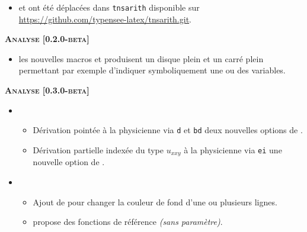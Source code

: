 \documentclass[12pt,a4paper]{book}
\begin{document}
\begin{description}
    \begin{itemize}[itemsep=.5em]
        \item {}  et  ont été déplacées dans \texttt{tnsarith} disponible sur \url{https://github.com/typensee-latex/tnsarith.git}.
    \end{itemize}
    
    
    \begin{center}
        \textbf{\textsc{Analyse [0.2.0-beta]}}
    \end{center}
    
    \begin{itemize}[itemsep=.5em]
        \item {} les nouvelles macros  et  produisent un disque plein et un carré plein permettant par exemple d'indiquer symboliquement une ou des variables.
        
        
    \end{itemize}
    
    
    \begin{center}
        \textbf{\textsc{Analyse [0.3.0-beta]}}
    \end{center}
    
    \begin{itemize}[itemsep=.5em]
        \item {}
        \begin{itemize}[itemsep=.5em]
            \item Dérivation pointée à la physicienne via \verb+d+ et \verb+bd+ deux nouvelles options de .
    
            \item Dérivation partielle indexée du type $u_{xxy}$ à la physicienne via \verb+ei+ une nouvelle option de .
        \end{itemize}
    
    
    
        
    
    
        \item {}
        \begin{itemize}[itemsep=.5em]
            \item Ajout de  pour changer la couleur de fond d'une ou plusieurs lignes.
    
    
            \item {} propose des fonctions de référence \emph{(sans paramètre)}.
        \end{itemize}
    

\end{itemize}
\end{description}
\end{document}
